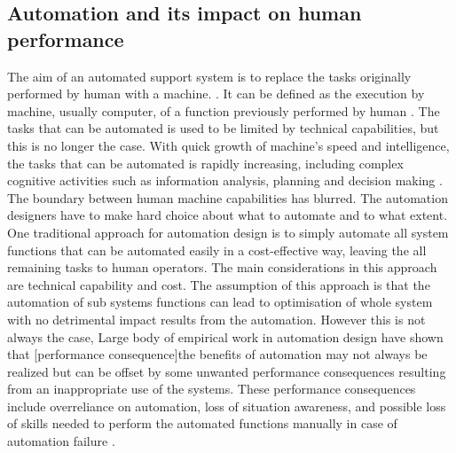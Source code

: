 

\subsection{Automation and its impact on human performance}
The aim of an automated support system is to replace the tasks originally performed by human with a machine. \cite{Bradshaw2011} . It can be defined as the execution by machine, usually computer, of a function previously performed by human \cite{Parasuraman1997}. The tasks that can be automated is used to be limited by technical capabilities, but this is no longer the case. With quick growth of machine's speed and intelligence, the tasks that can be automated is rapidly increasing, including complex cognitive activities such as information analysis, planning and decision making \cite{Parasuraman2000}. The boundary between human machine capabilities has blurred. The automation designers have to make hard choice about what to automate and to what extent.\\

One traditional approach for automation design is to simply automate all system functions that can be automated easily in a cost-effective way, leaving the all remaining tasks to human operators. The main considerations in this approach are technical capability and cost. The assumption of this approach is that the automation of sub systems functions can lead to optimisation of whole system with no detrimental impact results from the automation. However this is not always the case, Large body of empirical work in automation design have shown that [performance consequence]the benefits of automation may not always be realized but can be offset by some unwanted performance consequences resulting from an inappropriate use of the systems. These performance consequences include overreliance on automation, loss of situation awareness, and possible loss of skills needed to perform the automated functions manually in case of automation failure \cite{Kaber1997}.\\ 

